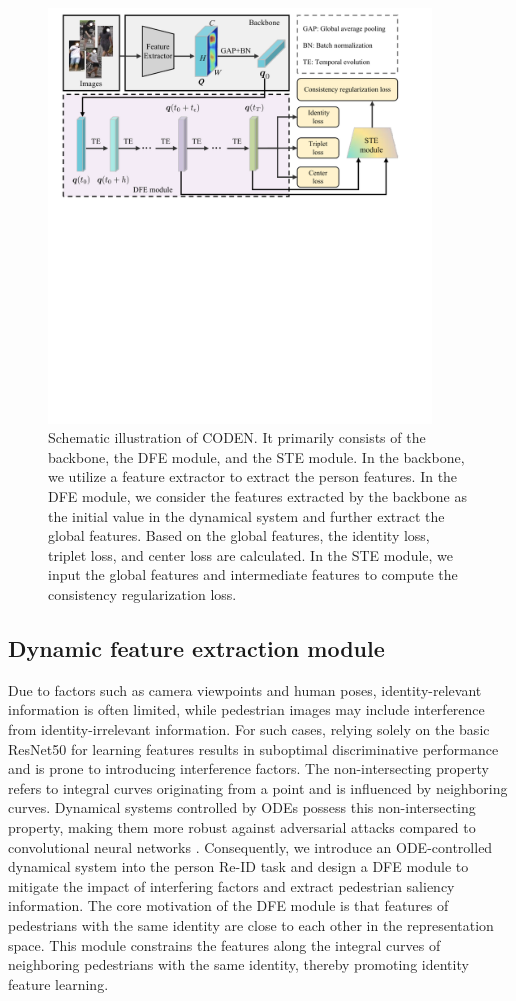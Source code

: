 \documentclass[12pt]{spieman}  %
\begin{document}
\begin{spacing}{2}
		\begin{figure}[!htbp]
			\centering
			\includegraphics[width=4.0in]{Figure_1}
			\caption{Schematic illustration of CODEN. It primarily consists of the backbone, the DFE module, and the STE module. In the backbone, we utilize a feature extractor to extract the person features. In the DFE module, we consider the features extracted by the backbone as the initial value in the dynamical system and further extract the global features. Based on the global features, the identity loss, triplet loss, and center loss are calculated. In the STE module, we input the global features and intermediate features to compute the consistency regularization loss.}
			\label{fig:CODEN_framework}
		\end{figure}
		
		\subsection{Dynamic feature extraction module}
		Due to factors such as camera viewpoints and human poses, identity-relevant information is often limited, while pedestrian images may include interference from identity-irrelevant information. For such cases, relying solely on the basic ResNet50 \cite{he2016deep} for learning features results in suboptimal discriminative performance and is prone to introducing interference factors. The non-intersecting property refers to integral curves originating from a point and is influenced by neighboring curves. Dynamical systems controlled by ODEs possess this non-intersecting property, making them more robust against adversarial attacks compared to convolutional neural networks \cite{chen2018neural, yan2019robustness}. Consequently, we introduce an ODE-controlled dynamical system into the person Re-ID task and design a DFE module to mitigate the impact of interfering factors and extract pedestrian saliency information. The core motivation of the DFE module is that features of pedestrians with the same identity are close to each other in the representation space. This module constrains the features along the integral curves of neighboring pedestrians with the same identity, thereby promoting identity feature learning.
		

\end{spacing}
\end{document}
